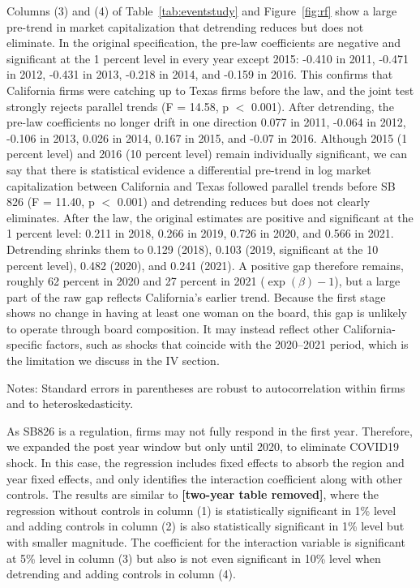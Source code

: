 \documentclass[12pt]{article}
\newcommand{\tablenotes}[1]{\par\vspace{4pt}\begin{minipage}{0.95\textwidth}\footnotesize #1\end{minipage}}
\begin{document}
Columns (3) and (4) of Table~\ref{tab:eventstudy} and Figure~\ref{fig:rf} show a large pre-trend in market capitalization that detrending reduces but does not eliminate. In the original specification, the pre-law coefficients are negative and significant at the 1 percent level in every year except 2015: -0.410 in 2011, -0.471 in 2012, -0.431 in 2013, -0.218 in 2014, and -0.159 in 2016. This confirms that California firms were catching up to Texas firms before the law, and the joint test strongly rejects parallel trends (F = 14.58, p $<$ 0.001). After detrending, the pre-law coefficients no longer drift in one direction 0.077 in 2011, -0.064 in 2012, -0.106 in 2013, 0.026 in 2014, 0.167 in 2015, and -0.07 in 2016. Although 2015 (1 percent level) and 2016 (10 percent level) remain individually significant, we can say that there is statistical evidence a differential pre-trend in log market capitalization between California and Texas followed parallel trends before SB 826 (F = 11.40, p $<$ 0.001) and detrending reduces but does not clearly eliminates. After the law, the original estimates are positive and significant at the 1 percent level: 0.211 in 2018, 0.266 in 2019, 0.726 in 2020, and 0.566 in 2021. Detrending shrinks them to 0.129 (2018), 0.103 (2019, significant at the 10 percent level), 0.482 (2020), and 0.241 (2021). A positive gap therefore remains, roughly 62 percent in 2020 and 27 percent in 2021 ($\exp(\beta) - 1$), but a large part of the raw gap reflects California's earlier trend. Because the first stage shows no change in having at least one woman on the board, this gap is unlikely to operate through board composition. It may instead reflect other California-specific factors, such as shocks that coincide with the 2020--2021 period, which is the limitation we discuss in the IV section.

\begin{table}[H]
\centering
\caption{DiD with firm and year FE, pre = 2011--2018, post = 2019 and 2020}
\label{tab:panel}
\small

\tablenotes{Notes: Standard errors in parentheses are robust to autocorrelation within firms and to heteroskedasticity.}
\end{table}

As SB826 is a regulation, firms may not fully respond in the first year. Therefore, we expanded the post year window but only until 2020, to eliminate COVID19 shock. In this case, the regression includes fixed effects to absorb the region and year fixed effects, and only identifies the interaction coefficient along with other controls. The results are similar to \textbf{[two-year table removed]}, where the regression without controls in column (1) is statistically significant in 1\% level and adding controls in column (2) is also statistically significant in 1\% level but with smaller magnitude. The coefficient for the interaction variable is significant at 5\% level in column (3) but also is not even significant in 10\% level when detrending and adding controls in column (4).
\end{document}
